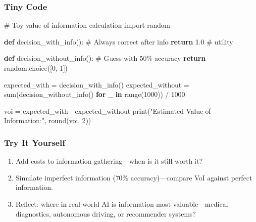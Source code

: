 \documentclass[
  letterpaper,
  DIV=11,
  numbers=noendperiod]{scrreprt}
\newenvironment{Shaded}{\begin{snugshade}}{\end{snugshade}}
\newcommand{\BuiltInTok}[1]{\textcolor[rgb]{0.00,0.23,0.31}{#1}}
\newcommand{\CommentTok}[1]{\textcolor[rgb]{0.37,0.37,0.37}{#1}}
\newcommand{\ControlFlowTok}[1]{\textcolor[rgb]{0.00,0.23,0.31}{\textbf{#1}}}
\newcommand{\DecValTok}[1]{\textcolor[rgb]{0.68,0.00,0.00}{#1}}
\newcommand{\FloatTok}[1]{\textcolor[rgb]{0.68,0.00,0.00}{#1}}
\newcommand{\ImportTok}[1]{\textcolor[rgb]{0.00,0.46,0.62}{#1}}
\newcommand{\KeywordTok}[1]{\textcolor[rgb]{0.00,0.23,0.31}{\textbf{#1}}}
\newcommand{\NormalTok}[1]{\textcolor[rgb]{0.00,0.23,0.31}{#1}}
\newcommand{\OperatorTok}[1]{\textcolor[rgb]{0.37,0.37,0.37}{#1}}
\newcommand{\StringTok}[1]{\textcolor[rgb]{0.13,0.47,0.30}{#1}}
\providecommand{\tightlist}{%
  \setlength{\itemsep}{0pt}\setlength{\parskip}{0pt}}
\begin{document}
\subsubsection{Tiny Code}\label{tiny-code-28}

\begin{Shaded}
\begin{Highlighting}[]
\CommentTok{\# Toy value of information calculation}
\ImportTok{import}\NormalTok{ random}

\KeywordTok{def}\NormalTok{ decision\_with\_info():}
    \CommentTok{\# Always correct after info}
    \ControlFlowTok{return} \FloatTok{1.0}  \CommentTok{\# utility}

\KeywordTok{def}\NormalTok{ decision\_without\_info():}
    \CommentTok{\# Guess with 50\% accuracy}
    \ControlFlowTok{return}\NormalTok{ random.choice([}\DecValTok{0}\NormalTok{, }\DecValTok{1}\NormalTok{])  }

\NormalTok{expected\_with }\OperatorTok{=}\NormalTok{ decision\_with\_info()}
\NormalTok{expected\_without }\OperatorTok{=} \BuiltInTok{sum}\NormalTok{(decision\_without\_info() }\ControlFlowTok{for}\NormalTok{ \_ }\KeywordTok{in} \BuiltInTok{range}\NormalTok{(}\DecValTok{1000}\NormalTok{)) }\OperatorTok{/} \DecValTok{1000}

\NormalTok{voi }\OperatorTok{=}\NormalTok{ expected\_with }\OperatorTok{{-}}\NormalTok{ expected\_without}
\BuiltInTok{print}\NormalTok{(}\StringTok{"Estimated Value of Information:"}\NormalTok{, }\BuiltInTok{round}\NormalTok{(voi, }\DecValTok{2}\NormalTok{))}
\end{Highlighting}
\end{Shaded}

\subsubsection{Try It Yourself}\label{try-it-yourself-28}

\begin{enumerate}
\def\labelenumi{\arabic{enumi}.}
\tightlist
\item
  Add costs to information gathering---when is it still worth it?
\item
  Simulate imperfect information (70\% accuracy)---compare VoI against
  perfect information.
\item
  Reflect: where in real-world AI is information most valuable---medical
  diagnostics, autonomous driving, or recommender systems?
\end{enumerate}
\end{document}
